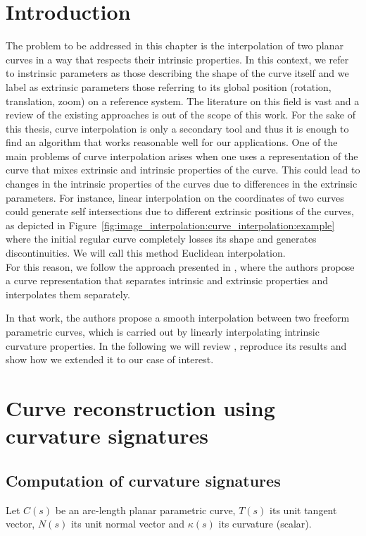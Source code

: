 \documentclass{ipol}
\begin{document}
\section{Introduction}
%
The problem to be addressed in this chapter is the interpolation of two planar curves in a way that respects their intrinsic properties. In this context, we refer to instrinsic parameters as those describing the shape of the curve itself and we label as extrinsic parameters those referring to its global position (rotation, translation, zoom) on a reference system. The literature on this field is vast and a review of the existing approaches is out of the scope of this work. For the sake of this thesis, curve interpolation is only a secondary tool and thus it is enough to find an algorithm that works reasonable well for our applications.
%
One of the main problems of curve interpolation arises when one uses a representation of the curve that mixes extrinsic and intrinsic properties of the curve. This could lead to changes in the intrinsic properties of the curves due to differences in the extrinsic parameters. For instance, linear interpolation on the coordinates of two curves could generate self intersections due to different extrinsic positions of the curves, as depicted in \mbox{Figure \ref{fig:image_interpolation:curve_interpolation:example}} where the initial regular curve completely losses its shape and generates discontinuities. We will call this method Euclidean interpolation.\\

For this reason, we follow the approach presented in \cite{im_proc:curve_interpolation:elber:07:metamorphosis_planar_parametric_curves}, where the authors propose a curve representation that separates intrinsic and extrinsic properties and interpolates them separately. 

In that work, the authors propose a smooth interpolation between two freeform parametric curves, which is carried out by linearly interpolating intrinsic curvature properties. In the following we will review \cite{im_proc:curve_interpolation:elber:07:metamorphosis_planar_parametric_curves}, reproduce its results and show how we extended it to our case of interest.

\section{Curve reconstruction using curvature signatures}\label{sec:curve_interpolation:curve_reconstruction}
\subsection{Computation of curvature signatures}
Let $C(s)$ be an arc-length planar parametric curve, $T(s)$ its unit tangent vector, $N(s)$ its unit normal vector and $\kappa (s)$ its curvature (scalar).\\
\end{document}
